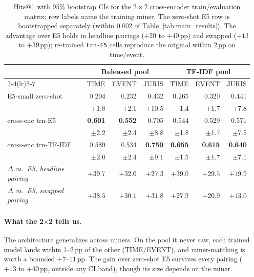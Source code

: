\documentclass[sigconf]{acmart}
\begin{document}
\begin{table}[t]
  \centering
  \small
  \caption{Hits@1 with 95\% bootstrap CIs for the $2\times 2$
    cross-encoder train/evaluation matrix; row labels name the
    training miner. The zero-shot E5 row is bootstrapped separately
    (within 0.002 of Table~\ref{tab:main_results}). The advantage
    over E5 holds in headline pairings ($+20$ to $+40$\,pp) and
    swapped ($+13$ to $+39$\,pp); re-trained \texttt{trn-E5} cells
    reproduce the original within 2\,pp on time/event.}
  \label{tab:robustness}
  \begin{tabular}{l rrr rrr}
    \toprule
    & \multicolumn{3}{c}{Released pool}
    & \multicolumn{3}{c}{TF-IDF pool} \\
    \cmidrule(lr){2-4}\cmidrule(lr){5-7}
    & TIME & EVENT & JURIS & TIME & EVENT & JURIS \\
    \midrule
    E5-small zero-shot       & 0.204 & 0.232 & 0.432 & 0.265 & 0.320 & 0.441 \\
                             & {\scriptsize $\pm$1.8} & {\scriptsize $\pm$2.1} & {\scriptsize $\pm$10.5} & {\scriptsize $\pm$1.4} & {\scriptsize $\pm$1.7} & {\scriptsize $\pm$7.8} \\
    \midrule
    cross-enc trn-E5        & \textbf{0.601} & \textbf{0.552} & 0.705 & 0.544 & 0.529 & 0.571 \\
                             & {\scriptsize $\pm$2.2} & {\scriptsize $\pm$2.4} & {\scriptsize $\pm$8.8} & {\scriptsize $\pm$1.8} & {\scriptsize $\pm$1.7} & {\scriptsize $\pm$7.5} \\
    cross-enc trn-TF-IDF    & 0.589 & 0.534 & \textbf{0.750} & \textbf{0.655} & \textbf{0.615} & \textbf{0.640} \\
                             & {\scriptsize $\pm$2.0} & {\scriptsize $\pm$2.4} & {\scriptsize $\pm$9.1} & {\scriptsize $\pm$1.5} & {\scriptsize $\pm$1.7} & {\scriptsize $\pm$7.1} \\
    \midrule
    \emph{$\Delta$ vs.\ E5, headline pairing} & $+39.7$ & $+32.0$ & $+27.3$ & $+39.0$ & $+29.5$ & $+19.9$ \\
    \emph{$\Delta$ vs.\ E5, swapped pairing} & $+38.5$ & $+30.1$ & $+31.8$ & $+27.9$ & $+20.9$ & $+13.0$ \\
    \bottomrule
  \end{tabular}
\end{table}

\paragraph{What the 2$\times$2 tells us.} The architecture
generalizes across miners. On the pool it never saw, each trained
model lands within 1--2\,pp of the other (TIME/EVENT), and
miner-matching is worth a bounded $+7$--$11$\,pp. The gain over
zero-shot E5 survives every pairing ($+13$ to $+40$\,pp, outside
any CI band), though its size depends on the miner.
\end{document}
